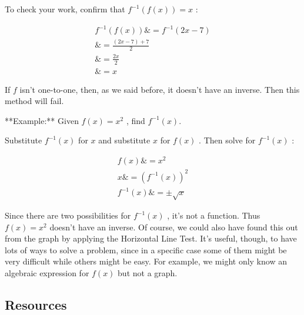 To check your work, confirm that $f^{-1}(f(x))=x$ :



\begin{align} f^{-1}(f(x)) \& = f^{-1}(2x - 7) \\ \& = \frac{(2x - 7) + 7}{2} \\ \& = \frac{2x}{2} \\ \& = x \end{align}



If $f$ isn't one-to-one, then, as we said before, it doesn't have an inverse. Then this
method will fail.



**Example:** Given $f(x)=x^2$ , find $f^{-1}(x)$.



Substitute $f^{-1}(x)$ for $x$ and substitute $x$ for $f(x)$ . Then solve for $f^{-1}(x)$ :



\begin{align} f(x) \&= x^2 \\ x \&= \left(f^{-1}(x)\right)^2 \\ f^{-1}(x) \&= \pm\sqrt{x} \end{align}



Since there are two possibilities for $f^{-1}(x)$ , it's not a function. Thus $f(x)=x^2$
doesn't have an inverse. Of course, we could also have found this out from the graph by
applying the Horizontal Line Test. It's useful, though, to have lots of ways to solve a
problem, since in a specific case some of them might be very difficult while others might
be easy. For example, we might only know an algebraic expression for $f(x)$ but not a
graph.




\subsection{Resources}
\label{sss:reso-55b5}




